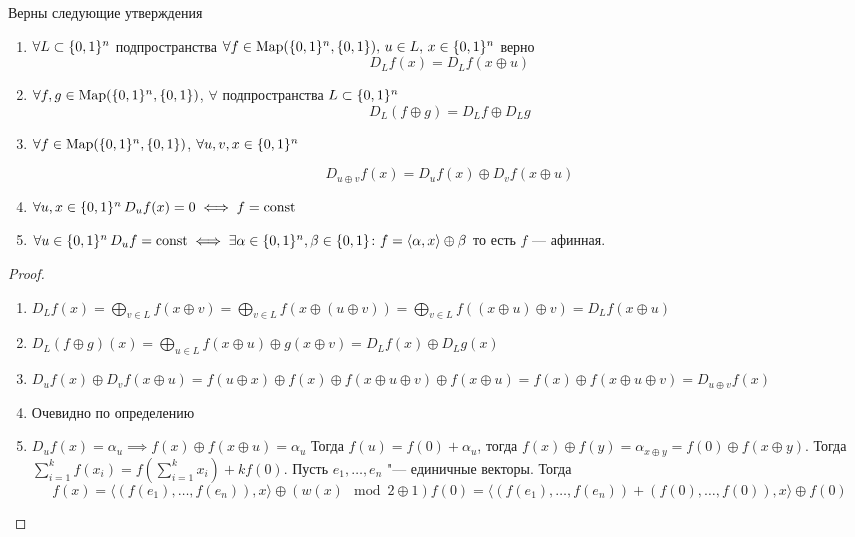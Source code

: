 \begin{proposition}
Верны следующие утверждения
\begin{enumerate}
\item $\forall L \subset \{0,1\}^n$ подпространства 
$\forall f \in \operatorname*{Map}(\{0,1\}^n, \{0,1\}), \, u \in L, \, x \in \{0,1\}^n$ верно
$$D_L f(x) = D_L f(x \oplus u)$$
\item $\forall f,g \in \operatorname*{Map}(\{0,1\}^n, \{0,1\})$, $\forall$ подпространства $L \subset \{0,1\}^n$
    $$D_L (f \oplus g) = D_L f \oplus D_L g$$
\item $\forall f \in \operatorname*{Map}(\{0,1\}^n, \{0,1\})$, $\forall u,v,x \in \{0,1\}^n$

    $$D_{u \oplus v} f(x) = D_u f(x) \oplus D_v f(x \oplus u)$$
\item $\forall u,x \in \{0,1\}^n \, D_u f(x) = 0 \iff f = \text{const}$
\item $\forall u \in \{0,1\}^n \, D_u f = \text{const} \iff 
      \exists \alpha \in \{0,1\}^n, \beta \in \{0,1\} \colon 
      f = \langle \alpha, x \rangle \oplus \beta$
      то есть $f$ --- афинная.
\end{enumerate}

\begin{proof}
\begin{enumerate}
\item $D_L f(x) = \bigoplus\limits_{v \in L} f(x \oplus v) = 
                  \bigoplus\limits_{v \in L} f(x \oplus (u\oplus v))
                  = \bigoplus\limits_{v \in L} f((x \oplus u )\oplus v)
                  = D_L f(x \oplus u)$
\item $D_L (f \oplus g) (x) = \bigoplus\limits_{u \in L} f(x \oplus u) 
          \oplus g(x \oplus v) = D_L f (x) \oplus D_L g(x)$
\item $D_{u} f(x) \oplus D_v f(x \oplus u) = f(u \oplus x) \oplus f(x)
       \oplus f(x \oplus u \oplus v) \oplus f(x \oplus u) =
        f(x) \oplus f(x \oplus u \oplus v) =  D_{u \oplus v} f(x)$
\item Очевидно по определению
\item $D_u f (x) = \alpha_u \implies f(x) \oplus f(x \oplus u) = \alpha_u$
      Тогда $f(u) = f(0) + \alpha_u$, тогда $f(x) \oplus f(y) = \alpha_{x \oplus y}
       = f(0) \oplus f(x \oplus y)$.
      Тогда $\sum\limits_{i=1}^k f(x_i) = f(\sum\limits_{i=1}^k x_i) + k f(0)$.
      Пусть $e_1, \ldots, e_n$ "--- единичные векторы. Тогда
      $$f(x) = \langle (f(e_1), \ldots, f(e_n)), x \rangle \oplus (w(x) \mod 2 \oplus 1) f(0) =
       \langle (f(e_1), \ldots, f(e_n)) + (f(0), \ldots, f(0)), x \rangle 
       \oplus f(0)$$
\end{enumerate}
\end{proof}


\end{proposition}
